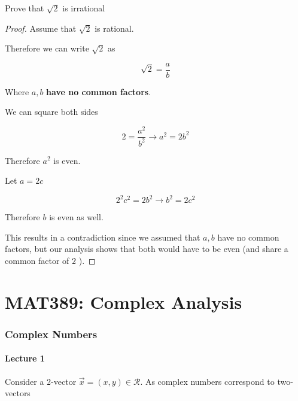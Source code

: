 \documentclass[10pt]{article}
\begin{document}
\begin{example}
	Prove that $ \sqrt{2}  $ is irrational
	\begin{proof}
		Assume that $ \sqrt{2}  $ is rational.

		Therefore we can write $ \sqrt{2}  $ as

		\begin{equation}
			\sqrt{2}  = \frac{a}{b}
		\end{equation}

		Where $ a, b $ \textbf{ have no common factors}.

		We can square both sides

		\begin{equation}
			2 = \frac{a^2}{b^2} \rightarrow a^2 = 2b^2
		\end{equation}

		Therefore $ a^2 $ is even. 

		Let $ a = 2c $ 

		\begin{equation}
			2^2 c^2 = 2b^2 \rightarrow b^2 = 2c^2
		\end{equation}

		Therefore $ b $ is even as well.

		This results in a contradiction since we assumed that $ a, b $ have no common factors, but our analysis shows that both would have to be even (and share a common factor of $ 2 $ ).
	\end{proof}
	
\end{example}







\part{MAT389: Complex Analysis}

\section{Complex Numbers}
\subsection{Lecture 1}

Consider a 2-vector $ \vec{x} = (x, y) \in \mathcal{R} $. 
As complex numbers correspond to two-vectors 
\end{document}
